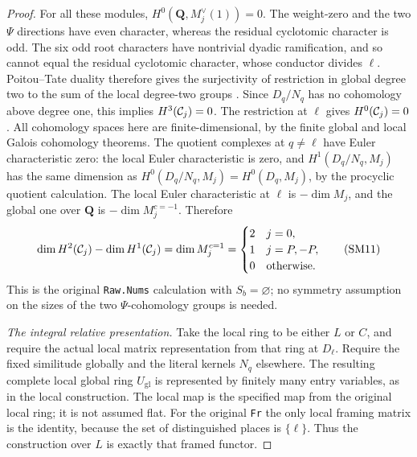 \begin{proof}
For all these modules, \(H^0(\mathbf Q,M_j^\vee(1))=0\).
The weight-zero and the two \(\Psi\) directions have even
character, whereas the residual cyclotomic character is odd.
The six odd root characters have nontrivial dyadic ramification,
and so cannot equal the residual cyclotomic character, whose
conductor divides \(\ell\). Poitou--Tate duality therefore
gives the surjectivity of restriction in global degree two
to the sum of the local degree-two groups
\cite{AuxTowerDuality}. Since \(D_q/N_q\) has no cohomology
above degree one, this implies \(H^3({\cal C}_j)=0\).
The restriction at \(\ell\) gives \(H^0({\cal C}_j)=0\).
All cohomology spaces here are finite-dimensional, by
the finite global and local Galois cohomology theorems.
The quotient complexes at \(q\ne\ell\) have Euler
characteristic zero: the local Euler characteristic is
zero, and \(H^1(D_q/N_q,M_j)\) has the same dimension
as \(H^0(D_q/N_q,M_j)=H^0(D_q,M_j)\), by the
procyclic quotient calculation.
The local Euler characteristic at \(\ell\) is
\(-\dim M_j\), and the global one over \(\mathbf Q\)
is \(-\dim M_j^{c=-1}\). Therefore
\[
 \dim H^2({\cal C}_j)-\dim H^1({\cal C}_j)
   =\dim M_j^{c=1}
   =\begin{cases}
      2& j=0,\\
      1& j=P,-P,\\
      0& \text{otherwise}.
     \end{cases}                                             \tag{SM11}
\]
This is the original \texttt{Raw.Nums} calculation with
\(S_b=\varnothing\); no symmetry assumption on the
sizes of the two \(\Psi\)-cohomology groups is needed.

\emph{The integral relative presentation.}
Take the local ring to be either \(L\) or \(C\), and
require the actual local matrix representation from
that ring at \(D_\ell\). Require the fixed similitude
globally and the literal kernels \(N_q\) elsewhere.
The resulting complete local global ring \(U_{\mathrm{gl}}\)
is represented by finitely many entry variables, as
in the local construction. The local map is the specified
map from the original local ring; it is not assumed flat.
For the original \texttt{Fr} the only local framing
matrix is the identity, because the set of distinguished
places is \(\{\ell\}\). Thus the construction over \(L\)
is exactly that framed functor.


\end{proof}
